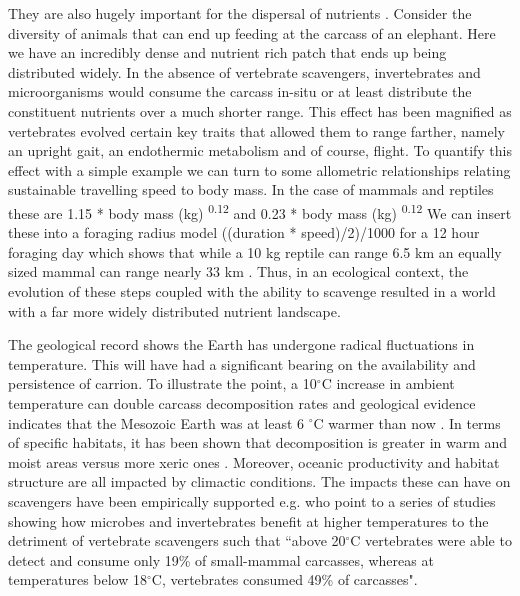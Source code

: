\documentclass[a4paper,12pt]{article}
\begin{document}
They are also hugely important for the dispersal of nutrients \citep{beasley2015vertebrates}.
Consider the diversity of animals that can end up feeding at the carcass of an elephant.
Here we have an incredibly dense and nutrient rich patch that ends up being distributed widely.
In the absence of vertebrate scavengers, invertebrates and microorganisms would consume the carcass in-situ or at least distribute the constituent nutrients over a much shorter range.
This effect has been magnified as vertebrates evolved certain key traits that allowed them to range farther, namely an upright gait, an endothermic metabolism and of course, flight.
To quantify this effect with a simple example we can turn to some allometric relationships relating sustainable travelling speed to body mass.
In the case of mammals and reptiles these are 1.15 * body mass (kg) \textsuperscript{0.12} and 0.23 * body mass (kg) \textsuperscript{0.12}
We can insert these into a foraging radius model ((duration * speed)/2)/1000 for a 12 hour foraging day which shows that while a 10 kg reptile can range 6.5 km an equally sized mammal can range nearly 33 km \citep{Enstipp2006Energetics}.
Thus, in an ecological context, the evolution of these steps coupled with the ability to scavenge resulted in a world with a far more widely distributed nutrient landscape.


The geological record shows the Earth has undergone radical fluctuations in temperature.
This will have had a significant bearing on the availability and persistence of carrion.
To illustrate the point, a 10$^{\circ}$C increase in ambient temperature can double carcass decomposition rates \citep{parmenter2009carrion} and geological evidence indicates that the Mesozoic Earth was at least 6 $^{\circ}$C warmer than now \citep{sellwood2006mesozoic}.
In terms of specific habitats, it has been shown that decomposition is greater in warm and moist areas versus more xeric ones \citep{beasley2015vertebrates}.
Moreover, oceanic productivity and habitat structure are all impacted by climactic conditions.
The impacts these can have on scavengers have been empirically supported e.g.
\cite{beasley2015vertebrates} who point to a series of studies showing how microbes and invertebrates benefit at higher temperatures to the detriment of vertebrate scavengers such that ``above 20$^{\circ}$C vertebrates were able to detect and consume only 19\% of small-mammal carcasses, whereas at temperatures below 18$^{\circ}$C, vertebrates consumed 49\% of carcasses".
\end{document}
